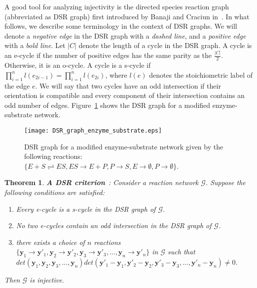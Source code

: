 \documentclass[11pt]{article}
\theoremstyle{plain}
\newtheorem{theorem}{Theorem}[section]
\theoremstyle{definition}
\theoremstyle{remark}
\newcommand\y{\boldsymbol{y}}
\newcommand\GG{\mathcal{G}}
\begin{document}
A good tool for analyzing injectivity is the directed species reaction graph (abbreviated as DSR graph) first introduced by Banaji and Craciun in~\cite{banaji2009graph}. In what follows, we describe some terminology in the context of DSR graphs. We will denote a \emph{negative edge} in the DSR graph with a \emph{dashed line}, and a \emph{positive edge} with a \emph{bold line}. Let $|C|$ denote the length of a cycle in the DSR graph. A cycle is an e-cycle if the number of positive edges has the same parity as the $\frac{|C|}{2}$. Otherwise, it is an o-cycle. A cycle is a s-cycle if $\displaystyle\prod_{i=1}^n l(e_{2i-1})= \displaystyle\prod_{i=1}^n l(e_{2i})$, where $l(e)$ denotes the stoichiometric label of the edge $e$. We will say that two cycles have an odd intersection if their orientation is compatible and every component of their intersection contains an odd number of edges. Figure~\ref{fig:DSR_enzyme_substrate} shows the DSR graph for a modified enzyme-substrate network.\\


\begin{figure}[h!]
\centering
\texttt{[image: DSR\_graph\_enzyme\_substrate.eps]}
\caption{DSR graph for a modified enzyme-substrate network given by the following reactions: $\{E + S \rightleftharpoons ES, ES \rightarrow E + P, P\rightarrow S, E\rightarrow \emptyset, P\rightarrow \emptyset\}$.}
\label{fig:DSR_enzyme_substrate}
\end{figure}

\begin{theorem}\label{thm:DSR_criterion}
\textbf{A DSR criterion}~\cite{banaji2009graph}: Consider a reaction network $\GG$. Suppose the following conditions are satisfied:
\begin{enumerate}
\item\label{s_cycle} Every e-cycle is a s-cycle in the DSR graph of $\GG$.
\item\label{e_cycle} No two e-cycles contain an odd intersection in the DSR graph of $\GG$.
\item \label{choice_reactions} there exists a choice of $n$ reactions $\{\y_1\rightarrow \y'_1,\y_2\rightarrow \y'_2,\y_3\rightarrow \y'_3,...,\y_n\rightarrow \y'_n\}$ in $\GG$ such that $det(\y_1,\y_2,\y_3,...,\y_n)det(\y'_1-\y_1,\y'_2-\y_2,\y'_3-\y_3,...,\y'_n-\y_n)\neq 0$.
\end{enumerate}
%
Then $\GG$ is injective.
\end{theorem}
\end{document}
